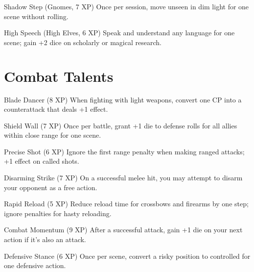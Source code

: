 \documentclass[11pt]{article}
\begin{document}
\begin{talentbox}{Shadow Step (Gnomes, 7 XP)}
Once per session, move unseen in dim light for one scene without rolling.
\end{talentbox}

\begin{talentbox}{High Speech (High Elves, 6 XP)}
Speak and understand any language for one scene; gain +2 dice on scholarly or magical research.
\end{talentbox}

\section*{Combat Talents}

\begin{talentbox}{Blade Dancer (8 XP)}
When fighting with light weapons, convert one CP into a counterattack that deals +1 effect.
\end{talentbox}

\begin{talentbox}{Shield Wall (7 XP)}
Once per battle, grant +1 die to defense rolls for all allies within close range for one scene.
\end{talentbox}

\begin{talentbox}{Precise Shot (6 XP)}
Ignore the first range penalty when making ranged attacks; +1 effect on called shots.
\end{talentbox}

\begin{talentbox}{Disarming Strike (7 XP)}
On a successful melee hit, you may attempt to disarm your opponent as a free action.
\end{talentbox}

\begin{talentbox}{Rapid Reload (5 XP)}
Reduce reload time for crossbows and firearms by one step; ignore penalties for hasty reloading.
\end{talentbox}

\begin{talentbox}{Combat Momentum (9 XP)}
After a successful attack, gain +1 die on your next action if it's also an attack.
\end{talentbox}

\begin{talentbox}{Defensive Stance (6 XP)}
Once per scene, convert a risky position to controlled for one defensive action.
\end{talentbox}
\end{document}
